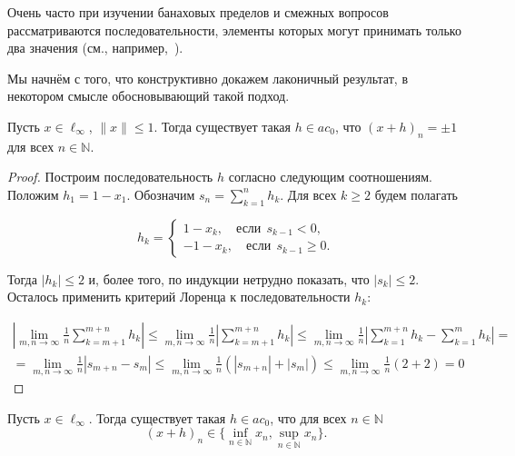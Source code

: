Очень часто при изучении банаховых пределов и смежных вопросов
рассматриваются последовательности,
элементы которых могут принимать только два значения
(см., например,~\cite{connor1990almost,our-mz2019ac0,avdeev2021vestnik,avdeev2021vmzprimes}).


Мы начнём с того,
что конструктивно докажем лаконичный результат,
в некотором смысле обосновывающий такой подход.


\begin{proposition}
	Пусть $x\in\ell_\infty$, $\|x\|\leq 1$.
	Тогда существует такая $h\in ac_0$, что $(x+h)_n = \pm 1$ для всех $n\in\mathbb N$.
\end{proposition}

\begin{proof}
	Построим последовательность $h$ согласно следующим соотношениям.
	Положим $h_1 = 1-x_1$.
	Обозначим $s_n = \sum_{k=1}^n h_k$.
	Для всех $k\geq 2$ будем полагать

	$$
		h_k = \begin{cases}
			1-x_k, \quad\mbox{если}~~ s_{k-1} < 0,
			\\
			-1 - x_k,\quad\mbox{если}~~ s_{k-1} \geq 0
			.
		\end{cases}
	$$

	Тогда $|h_k| \leq 2$ и, более того, по индукции нетрудно показать, что $|s_k| \leq 2$. Осталось применить критерий Лоренца к последовательности $h_k$:

	\begin{multline*}
		\left|\lim_{m,n\to \infty} \frac{1}{n} \sum_{k=m+1}^{m+n} h_k\right| \leq
		\lim_{m,n\to \infty} \frac{1}{n} \left|\sum_{k=m+1}^{m+n} h_k\right| \leq
		\lim_{m,n\to \infty} \frac{1}{n} \left|\sum_{k=1}^{m+n} h_k - \sum_{k=1}^{m} h_k  \right| =
		\\=
		\lim_{m,n\to \infty} \frac{1}{n} \left|s_{m+n} - s_{m}  \right| \leq
		\lim_{m,n\to \infty} \frac{1}{n} (|s_{m+n}| + |s_{m} |) \leq
		\lim_{m,n\to \infty} \frac{1}{n} (2 + 2) =0
	\end{multline*}
\end{proof}

\begin{corollary}
	Пусть $x\in\ell_\infty$.
	Тогда существует такая $h\in ac_0$, что для всех $n\in\mathbb N$
	\begin{equation*}
		(x+h)_n \in \{\inf_{n\in\mathbb N} x_n,\sup_{n\in\mathbb N} x_n\}
		.
	\end{equation*}
\end{corollary}


